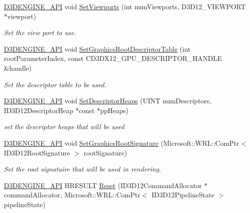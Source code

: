 \begin{DoxyCompactItemize}
\mbox{\hyperlink{stdafx_8h_a8ee2d990c5dfba7794dd2b60741d7722}{D3\+D\+E\+N\+G\+I\+N\+E\+\_\+\+A\+PI}} void \mbox{\hyperlink{class_command_list_manager_a305dbc487b85888d293e8b99daac5d39}{Set\+Viewports}} (int num\+Viewports, D3\+D12\+\_\+\+V\+I\+E\+W\+P\+O\+RT $\ast$viewport)
\begin{DoxyCompactList}\small\item\em Set the view port to use. \end{DoxyCompactList}\item 
\mbox{\hyperlink{stdafx_8h_a8ee2d990c5dfba7794dd2b60741d7722}{D3\+D\+E\+N\+G\+I\+N\+E\+\_\+\+A\+PI}} void \mbox{\hyperlink{class_command_list_manager_aa3a6aaa40f655f816e1e0ec49e3ce25b}{Set\+Graphics\+Root\+Descriptor\+Table}} (int root\+Parameter\+Index, const C\+D3\+D\+X12\+\_\+\+G\+P\+U\+\_\+\+D\+E\+S\+C\+R\+I\+P\+T\+O\+R\+\_\+\+H\+A\+N\+D\+LE \&handle)
\begin{DoxyCompactList}\small\item\em Set the descriptor table to be used. \end{DoxyCompactList}\item 
\mbox{\hyperlink{stdafx_8h_a8ee2d990c5dfba7794dd2b60741d7722}{D3\+D\+E\+N\+G\+I\+N\+E\+\_\+\+A\+PI}} void \mbox{\hyperlink{class_command_list_manager_a33a7c452731ebd9a2d8251874e120b13}{Set\+Descriptor\+Heaps}} (U\+I\+NT num\+Descriptors, I\+D3\+D12\+Descriptor\+Heap $\ast$const $\ast$pp\+Heaps)
\begin{DoxyCompactList}\small\item\em set the descriptor heaps that will be used \end{DoxyCompactList}\item 
\mbox{\hyperlink{stdafx_8h_a8ee2d990c5dfba7794dd2b60741d7722}{D3\+D\+E\+N\+G\+I\+N\+E\+\_\+\+A\+PI}} void \mbox{\hyperlink{class_command_list_manager_abfaf0356636617fc6007ff64b9c45fe1}{Set\+Graphics\+Root\+Signature}} (Microsoft\+::\+W\+R\+L\+::\+Com\+Ptr$<$ I\+D3\+D12\+Root\+Signature $>$ root\+Signature)
\begin{DoxyCompactList}\small\item\em Set the root signatuire that will be used in rendering. \end{DoxyCompactList}\item 
\mbox{\hyperlink{stdafx_8h_a8ee2d990c5dfba7794dd2b60741d7722}{D3\+D\+E\+N\+G\+I\+N\+E\+\_\+\+A\+PI}} H\+R\+E\+S\+U\+LT \mbox{\hyperlink{class_command_list_manager_a7106132e048a3f62f97bf62f98e81588}{Reset}} (I\+D3\+D12\+Command\+Allocator $\ast$command\+Allocator, Microsoft\+::\+W\+R\+L\+::\+Com\+Ptr$<$ I\+D3\+D12\+Pipeline\+State $>$ pipeline\+State)

\end{DoxyCompactItemize}
